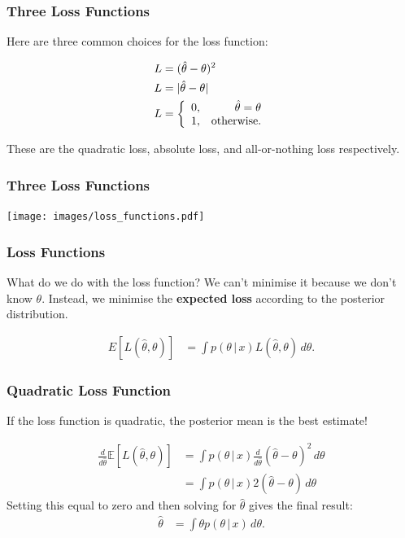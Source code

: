 \documentclass{beamer}
\newcommand{\given}{\,|\,}
\begin{document}
\begin{frame}
\frametitle{Three Loss Functions}
Here are three common choices for the loss function:

\begin{align}
L &= (\hat{\theta} - \theta)^2 \\
L &= |\hat{\theta} - \theta| \\
L &= \left\{
        \begin{array}{lr}
        0, & \hat{\theta} = \theta \\
        1, & \textnormal{otherwise.}
        \end{array}
        \right.
\end{align}

These are the quadratic loss, absolute loss, and all-or-nothing loss
respectively.
\end{frame}



\begin{frame}
\frametitle{Three Loss Functions}

\centering
\texttt{[image: images/loss\_functions.pdf]}

\end{frame}

\begin{frame}
\frametitle{Loss Functions}
What do we do with the loss function? We can't minimise it because we don't
know $\theta$. Instead, we minimise the {\bf expected loss} according to the
posterior distribution.

\begin{align}
E\left[L(\hat{\theta}, \theta)\right]
    &= \int p(\theta \given x) L(\hat{\theta}, \theta) \, d\theta.
\end{align}

\end{frame}


\begin{frame}
\frametitle{Quadratic Loss Function}
If the loss function is quadratic, the posterior mean is the best estimate!

\begin{align}
\frac{d}{d\hat{\theta}}\mathds{E}\left[L(\hat{\theta}, \theta)\right] &=
\int p(\theta \given x)\frac{d}{d\hat{\theta}}(\hat{\theta} - \theta)^2 \, d\theta \\
&= \int p(\theta\given x)2(\hat{\theta} - \theta) \, d\theta
\end{align}
Setting this equal to zero and then solving for $\hat{\theta}$ gives the final
result:
\begin{align}
\hat{\theta} &= \int \theta p(\theta\given x) \, d\theta.
\end{align}


\end{frame}
\end{document}
